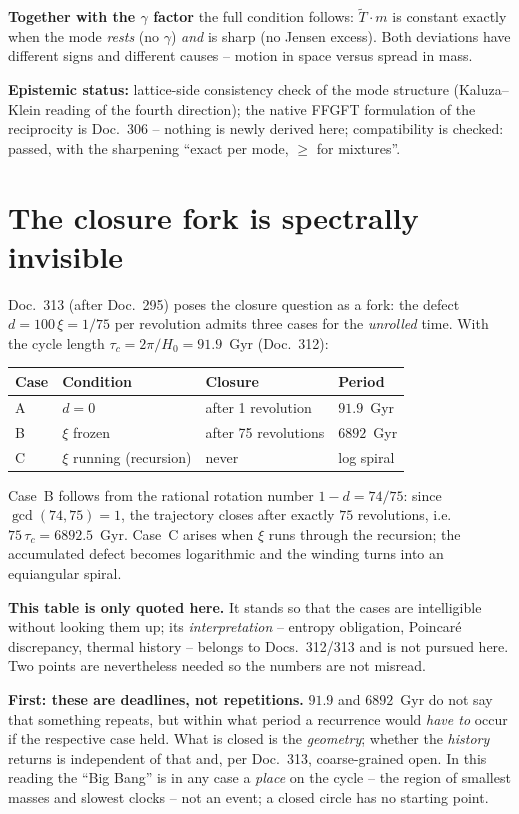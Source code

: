 \documentclass[11pt]{report}
\begin{document}
\textbf{Together with the $\gamma$ factor} the full condition
follows: $\tilde T\cdot m$ is constant exactly when the mode
\emph{rests} (no $\gamma$) \emph{and} is sharp (no Jensen excess).
Both deviations have different signs and different causes --
motion in space versus spread in mass.

\textbf{Epistemic status:} lattice-side consistency check of the
mode structure (Kaluza--Klein reading of the fourth direction);
the native FFGFT formulation of the reciprocity is Doc.~306 --
nothing is newly derived here; compatibility is checked: passed,
with the sharpening \enquote{exact per mode, $\ge$ for
mixtures}.

\section{The closure fork is spectrally invisible}

Doc.~313 (after Doc.~295) poses the closure question as a fork:
the defect $d = 100\,\xi = 1/75$ per revolution admits three cases
for the \emph{unrolled} time. With the cycle length
$\tau_c = 2\pi/H_0 = 91.9$~Gyr (Doc.~312):

\begin{center}
\begin{tabular}{llll}
\toprule
Case & Condition & Closure & Period \\
\midrule
A & $d = 0$ & after 1 revolution & $91.9$~Gyr \\
B & $\xi$ frozen & after 75 revolutions & $6892$~Gyr \\
C & $\xi$ running (recursion) & never & log spiral \\
\bottomrule
\end{tabular}
\end{center}

\noindent Case~B follows from the rational rotation number
$1-d = 74/75$: since $\gcd(74,75) = 1$, the trajectory closes
after exactly $75$ revolutions, i.e.\ $75\,\tau_c = 6892.5$~Gyr.
Case~C arises when $\xi$ runs through the recursion; the
accumulated defect becomes logarithmic and the winding turns into
an equiangular spiral.

\textbf{This table is only quoted here.} It stands so that the
cases are intelligible without looking them up; its
\emph{interpretation} -- entropy obligation, Poincaré discrepancy,
thermal history -- belongs to Docs.~312/313 and is not pursued
here. Two points are nevertheless needed so the numbers are not
misread.

\textbf{First: these are deadlines, not repetitions.} $91.9$ and
$6892$~Gyr do not say that something repeats, but within what
period a recurrence would \emph{have to} occur if the respective
case held. What is closed is the \emph{geometry}; whether the
\emph{history} returns is independent of that and, per Doc.~313,
coarse-grained open. In this reading the \enquote{Big Bang} is in
any case a \emph{place} on the cycle -- the region of smallest
masses and slowest clocks -- not an event; a closed circle has no
starting point.
\end{document}
